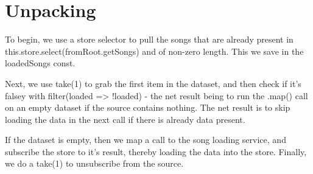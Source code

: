 \section{ Unpacking }
To begin, we use a store selector to pull the songs that are already present in
this.store.select(fromRoot.getSongs) and of non-zero length. This we save in the
loadedSongs const.

Next, we use take(1) to grab the first item in the dataset, and then check if
it's falsey with filter(loaded => !loaded) - the net result being to run the
.map() call on an empty dataset if the source contains nothing. The net result
is to skip loading the data in the next call if there is already data present.

If the dataset is empty, then we map a call to the song loading service, and
subscribe the store to it's result, thereby loading the data into the store.
Finally, we do a take(1) to unsubscribe from the source.
